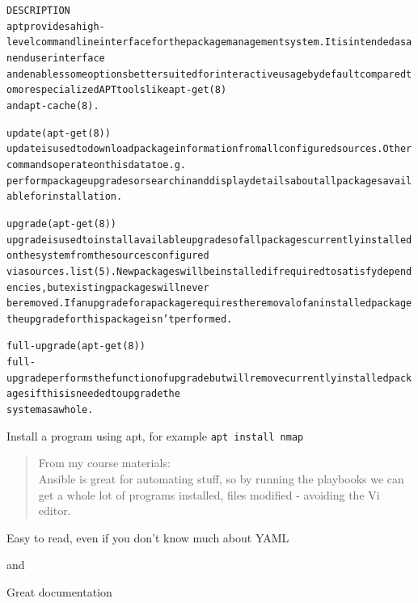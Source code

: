 \documentclass[Screen16to9,17pt]{foils}
\begin{document}


\begin{alltt}\footnotesize
DESCRIPTION
apt provides a high-level commandline interface for the package management system. It is intended as an end user interface
and enables some options better suited for interactive usage by default compared to more specialized APT tools like apt-get(8)
and apt-cache(8).

update (apt-get(8))
  update is used to download package information from all configured sources. Other commands operate on this data to e.g.
  perform package upgrades or search in and display details about all packages available for installation.

upgrade (apt-get(8))
  upgrade is used to install available upgrades of all packages currently installed on the system from the sources configured
  via sources.list(5). New packages will be installed if required to satisfy dependencies, but existing packages will never
  be removed. If an upgrade for a package requires the removal of an installed package the upgrade for this package isn't performed.

full-upgrade (apt-get(8))
  full-upgrade performs the function of upgrade but will remove currently installed packages if this is needed to upgrade the
  system as a whole.
\end{alltt}

\begin{list2}
  \item Install a program using apt, for example \verb+apt install nmap+
\end{list2}





\begin{quote}
From my course materials:\\
Ansible is great for automating stuff, so by running the playbooks we can get a whole lot of programs installed, files modified - avoiding the Vi editor.
\end{quote}

\begin{list2}
\item Easy to read, even if you don't know much about YAML
\item {} and 
\item Great documentation\\
\end{list2}
\end{document}
